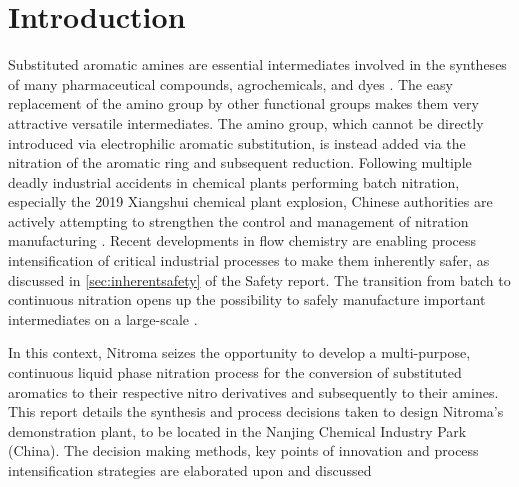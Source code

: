\section{Introduction} %

Substituted aromatic amines are essential intermediates involved in the syntheses of many pharmaceutical compounds, agrochemicals, and dyes \cite{vogt_amines_2000}. The easy replacement of the amino group by other functional groups makes them very attractive versatile intermediates. The amino group, which cannot be directly introduced via electrophilic aromatic substitution, is instead added via the nitration of the aromatic ring and subsequent reduction.
Following multiple deadly industrial accidents in chemical plants performing batch nitration, especially the 2019 Xiangshui chemical plant explosion, Chinese authorities are actively attempting to strengthen the control and management of nitration manufacturing \cite{el_diario_china_2019}.
Recent developments in flow chemistry are enabling process intensification of critical industrial processes to make them inherently safer, as discussed in \cref{sec:inherentsafety} of the Safety report. The transition from batch to continuous nitration opens up the possibility to safely manufacture important intermediates on a large-scale \cite{di_miceli_raimondi_safety_2015}.

In this context, Nitroma seizes the opportunity to develop a multi-purpose, continuous liquid phase nitration process for the conversion of substituted aromatics to their respective nitro derivatives and subsequently to their amines.
This report details the synthesis and process decisions taken to design Nitroma’s demonstration plant, to be located in the Nanjing Chemical Industry Park (China). The decision making methods, key points of innovation and process intensification strategies are elaborated upon and discussed
